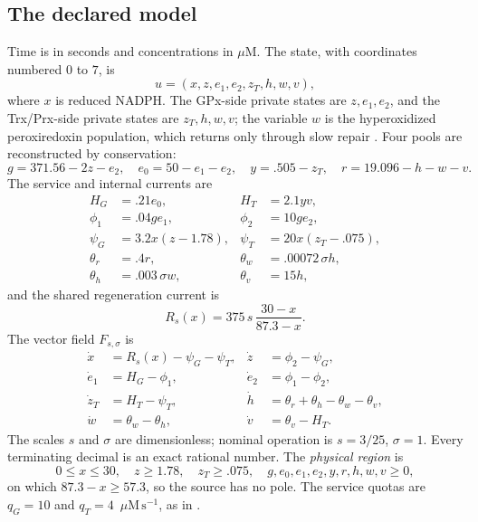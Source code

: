 \documentclass[11pt,a4paper]{article}
\theoremstyle{plain}
\theoremstyle{definition}
\theoremstyle{remark}
\newcommand{\uM}{\ensuremath{\mu\mathrm{M}}}
\newcommand{\fluxunit}{\ensuremath{\mu\mathrm{M}\,\mathrm{s}^{-1}}}
\newcommand{\HG}{H_G}
\newcommand{\HT}{H_T}
\begin{document}
\subsection{The declared model}
Time is in seconds and concentrations in \uM. The state, with coordinates
numbered $0$ to $7$, is
\[
u=(x,z,e_1,e_2,z_T,h,w,v),
\]
where $x$ is reduced NADPH. The GPx-side private states are $z,e_1,e_2$, and
the Trx/Prx-side private states are $z_T,h,w,v$; the variable $w$ is the
hyperoxidized peroxiredoxin population, which returns only through slow repair
\citep{wood2003,biteau2003}. Four pools are reconstructed by conservation:
\begin{equation}\label{eq:pools}
g=371.56-2z-e_2,\quad e_0=50-e_1-e_2,\quad y=.505-z_T,\quad r=19.096-h-w-v.
\end{equation}
The service and internal currents are
\begin{align}
\HG&=.21e_0,& \HT&=2.1yv,\nonumber\\
\phi_1&=.04ge_1,&\phi_2&=10ge_2,\nonumber\\
\psi_G&=3.2x(z-1.78),&\psi_T&=20x(z_T-.075),\label{eq:rates}\\
\theta_r&=.4r,&\theta_w&=.00072\,\sigma h,\nonumber\\
\theta_h&=.003\,\sigma w,&\theta_v&=15h,\nonumber
\end{align}
and the shared regeneration current is
\begin{equation}\label{eq:regen}
R_s(x)=375\,s\,\frac{30-x}{87.3-x}.
\end{equation}
The vector field $F_{s,\sigma}$ is
\begin{align}
\dot x&=R_s(x)-\psi_G-\psi_T,& \dot z&=\phi_2-\psi_G,\nonumber\\
\dot e_1&=\HG-\phi_1,&\dot e_2&=\phi_1-\phi_2,\nonumber\\
\dot z_T&=\HT-\psi_T,&\dot h&=\theta_r+\theta_h-\theta_w-\theta_v,\label{eq:ode}\\
\dot w&=\theta_w-\theta_h,&\dot v&=\theta_v-\HT.\nonumber
\end{align}
The scales $s$ and $\sigma$ are dimensionless; nominal operation is
$s=3/25$, $\sigma=1$. Every terminating decimal is an exact rational number.
The \emph{physical region} is
\begin{equation}\label{eq:physical}
0\le x\le30,\quad z\ge1.78,\quad z_T\ge.075,\quad g,e_0,e_1,e_2,y,r,h,w,v\ge0,
\end{equation}
on which $87.3-x\ge57.3$, so the source has no pole. The service quotas are
$q_G=10$ and $q_T=4$~\fluxunit, as in \citep{companionNADPH}.
\end{document}
